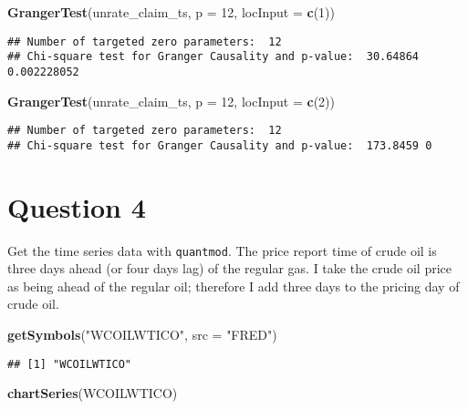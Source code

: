 \documentclass[]{article}
\newenvironment{Shaded}{\begin{snugshade}}{\end{snugshade}}
\newcommand{\KeywordTok}[1]{\textcolor[rgb]{0.13,0.29,0.53}{\textbf{#1}}}
\newcommand{\DataTypeTok}[1]{\textcolor[rgb]{0.13,0.29,0.53}{#1}}
\newcommand{\DecValTok}[1]{\textcolor[rgb]{0.00,0.00,0.81}{#1}}
\newcommand{\StringTok}[1]{\textcolor[rgb]{0.31,0.60,0.02}{#1}}
\newcommand{\NormalTok}[1]{#1}
\begin{document}
\begin{Shaded}
\begin{Highlighting}[]
\KeywordTok{GrangerTest}\NormalTok{(unrate_claim_ts, }\DataTypeTok{p =} \DecValTok{12}\NormalTok{, }\DataTypeTok{locInput =} \KeywordTok{c}\NormalTok{(}\DecValTok{1}\NormalTok{))}
\end{Highlighting}
\end{Shaded}

\begin{verbatim}
## Number of targeted zero parameters:  12 
## Chi-square test for Granger Causality and p-value:  30.64864 0.002228052
\end{verbatim}

\begin{Shaded}
\begin{Highlighting}[]
\KeywordTok{GrangerTest}\NormalTok{(unrate_claim_ts, }\DataTypeTok{p =} \DecValTok{12}\NormalTok{, }\DataTypeTok{locInput =} \KeywordTok{c}\NormalTok{(}\DecValTok{2}\NormalTok{))}
\end{Highlighting}
\end{Shaded}

\begin{verbatim}
## Number of targeted zero parameters:  12 
## Chi-square test for Granger Causality and p-value:  173.8459 0
\end{verbatim}

\section{Question 4}\label{question-4}

Get the time series data with \texttt{quantmod}. The price report time
of crude oil is three days ahead (or four days lag) of the regular gas.
I take the crude oil price as being ahead of the regular oil; therefore
I add three days to the pricing day of crude oil.

\begin{Shaded}
\begin{Highlighting}[]
\KeywordTok{getSymbols}\NormalTok{(}\StringTok{"WCOILWTICO"}\NormalTok{, }\DataTypeTok{src =} \StringTok{"FRED"}\NormalTok{)}
\end{Highlighting}
\end{Shaded}

\begin{verbatim}
## [1] "WCOILWTICO"
\end{verbatim}

\begin{Shaded}
\begin{Highlighting}[]
\KeywordTok{chartSeries}\NormalTok{(WCOILWTICO)}
\end{Highlighting}
\end{Shaded}
\end{document}
